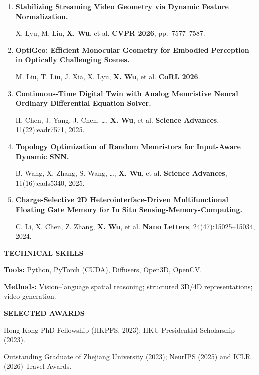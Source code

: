 \documentclass[a4paper]{article}
\newcommand{\cvsection}[1]{%
  \par\vspace{2.0pt}%
  {\color{cvblue}\fontsize{11}{12.2}\selectfont\bfseries\MakeUppercase{#1}}\par
  \vspace{-4pt}{\color{cvblue}\rule{\textwidth}{0.4pt}}\par\vspace{1.0pt}%
}
\begin{document}
{\begin{enumerate}[resume,leftmargin=1.6em,labelsep=0.38em,itemsep=0.4pt,topsep=1.3pt,parsep=0pt,partopsep=0pt]
M. Liu, X. Lyu, T. Ren, P. Dai, \textbf{X. Wu}, et al. \hfill \textbf{ECCV 2026}.
\item \textbf{Stabilizing Streaming Video Geometry via Dynamic Feature Normalization.}\par
X. Lyu, M. Liu, \textbf{X. Wu}, et al. \hfill \textbf{CVPR 2026}, pp.\ 7577--7587.
\item \textbf{OptiGeo: Efficient Monocular Geometry for Embodied Perception in Optically Challenging Scenes.}\par
M. Liu, T. Liu, J. Xia, X. Lyu, \textbf{X. Wu}, et al. \hfill \textbf{CoRL 2026}.
\item \textbf{Continuous-Time Digital Twin with Analog Memristive Neural Ordinary Differential Equation Solver.}\par
H. Chen, J. Yang, J. Chen, \ldots, \textbf{X. Wu}, et al. \hfill \textbf{Science Advances}, 11(22):eadr7571, 2025.
\item \textbf{Topology Optimization of Random Memristors for Input-Aware Dynamic SNN.}\par
B. Wang, X. Zhang, S. Wang, \ldots, \textbf{X. Wu}, et al. \hfill \textbf{Science Advances}, 11(16):eads5340, 2025.
\item \textbf{Charge-Selective 2D Heterointerface-Driven Multifunctional Floating Gate Memory for In Situ Sensing-Memory-Computing.}\par
C. Li, X. Chen, Z. Zhang, \textbf{X. Wu}, et al. \hfill \textbf{Nano Letters}, 24(47):15025--15034, 2024.
\end{enumerate}}

\cvsection{Technical Skills}
\textbf{Tools:} Python, PyTorch (CUDA), Diffusers, Open3D, OpenCV.\par
\textbf{Methods:} Vision--language spatial reasoning; structured 3D/4D representations; video generation.


\cvsection{Selected Awards}
Hong Kong PhD Fellowship (HKPFS, 2023); HKU Presidential Scholarship (2023).\par
Outstanding Graduate of Zhejiang University (2023); NeurIPS (2025) and ICLR (2026) Travel Awards.
\end{document}
